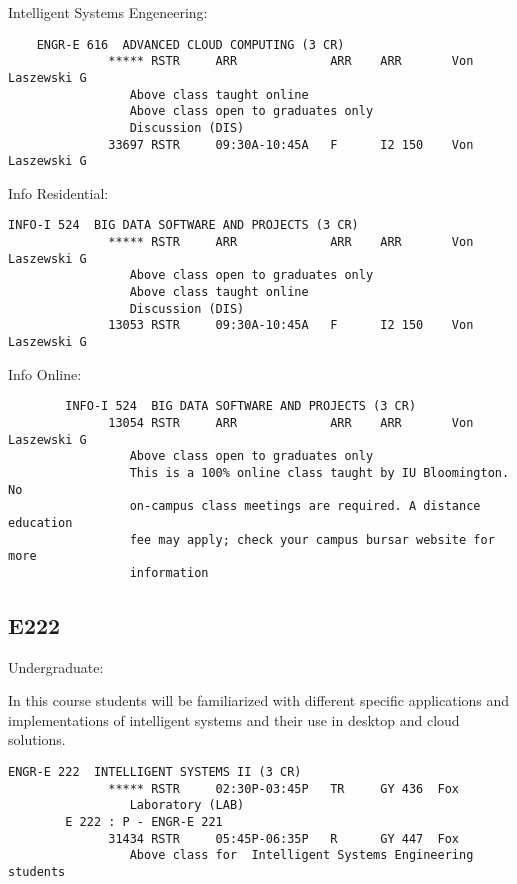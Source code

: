 Intelligent Systems Engeneering:

\begin{verbatim}
	ENGR-E 616  ADVANCED CLOUD COMPUTING (3 CR)
              ***** RSTR     ARR             ARR    ARR       Von Laszewski G
                 Above class taught online
                 Above class open to graduates only
                 Discussion (DIS)
              33697 RSTR     09:30A-10:45A   F      I2 150    Von Laszewski G
\end{verbatim}

Info Residential:



\begin{verbatim}
INFO-I 524  BIG DATA SOFTWARE AND PROJECTS (3 CR) 
              ***** RSTR     ARR             ARR    ARR       Von Laszewski G          
                 Above class open to graduates only
                 Above class taught online
                 Discussion (DIS)
              13053 RSTR     09:30A-10:45A   F      I2 150    Von Laszewski G  
\end{verbatim}

Info Online:

\begin{verbatim}        
        INFO-I 524  BIG DATA SOFTWARE AND PROJECTS (3 CR)
              13054 RSTR     ARR             ARR    ARR       Von Laszewski G          
                 Above class open to graduates only
                 This is a 100% online class taught by IU Bloomington. No
                 on-campus class meetings are required. A distance education
                 fee may apply; check your campus bursar website for more
                 information
\end{verbatim}

\subsection{E222}

Undergraduate:

In this course students will be familiarized with different specific 
applications and implementations of intelligent systems and their use 
in desktop and cloud solutions.

\begin{verbatim}
ENGR-E 222  INTELLIGENT SYSTEMS II (3 CR)
              ***** RSTR     02:30P-03:45P   TR     GY 436  Fox
                 Laboratory (LAB)
        E 222 : P - ENGR-E 221
              31434 RSTR     05:45P-06:35P   R      GY 447  Fox
                 Above class for  Intelligent Systems Engineering students

\end{verbatim}        



